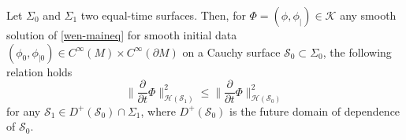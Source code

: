 \begin{proposition}\label{wen-propcau}
Let $\Sigma_0$ and $\Sigma_1$ two equal-time surfaces. 
Then, for $\Phi = (\phi, \phi_|) \in \mathcal{K}$ any smooth solution of \cref{wen-maineq} for smooth initial data $(\phi_0, \phi_{|0}) \in C^\infty(M) \times C^\infty(\partial M)$ on a Cauchy surface $\mathcal{S}_0 \subset \Sigma_0$,
the following relation holds
\begin{equation}\label{wen-causal}
\big\| \frac{\partial}{\partial t} \Phi \big\|_{\mathcal{H}(\mathcal{S}_1)}^2
\leq 
\big\| \frac{\partial}{\partial t} \Phi \big\|_{\mathcal{H}(\mathcal{S}_0)}^2
\end{equation}
for any $\mathcal{S}_1 \in D^+(\mathcal{S}_0)\cap\Sigma_1$, where $D^+(\mathcal{S}_0)$ is the future domain of dependence of $\mathcal{S}_0$.
\end{proposition}
